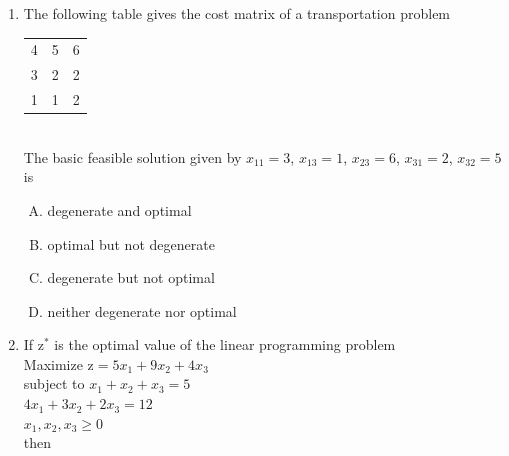 \documentclass[journal,12pt,twocolumn]{IEEEtran}
\begin{document}
\begin{enumerate}
\item The following table gives the cost matrix of a transportation problem \\
\medskip
\begin{tabular}{|c c c|} \hline
4 & 5 & 6 \\
3 & 2 & 2 \\
1 & 1 & 2 \\ \hline
\end{tabular}
\\
\medskip
The basic feasible solution given by $x_{11} \! = \! 3$, $x_{13} \! = \! 1$, $x_{23} \! = \! 6$, $x_{31} \! = \! 2$, $x_{32} \! = \! 5$ is
\begin{enumerate}[(A)]
\setlength\itemsep{1em}
\item degenerate and optimal
\item optimal but not degenerate
\item degenerate but not optimal
\item neither degenerate nor optimal
\end{enumerate}

\item If $\text{z}^{*}$ is the optimal value of the linear programming problem \\
Maximize $\text{z} \! = \! 5x_1 \! + \! 9x_2 \! + \! 4x_3$ \\
subject to $x_1 \! + \! x_2 \! + \! x_3 \! = \! 5$ \\
$4x_1 \! + \! 3x_2 \! + \! 2x_3 \! = \! 12$ \\
$x_1, \! x_2, \! x_3 \! \geqslant \! 0$ \\
then
\begin{enumerate}[(A)]
\end{enumerate}


\end{enumerate}
\end{document}
